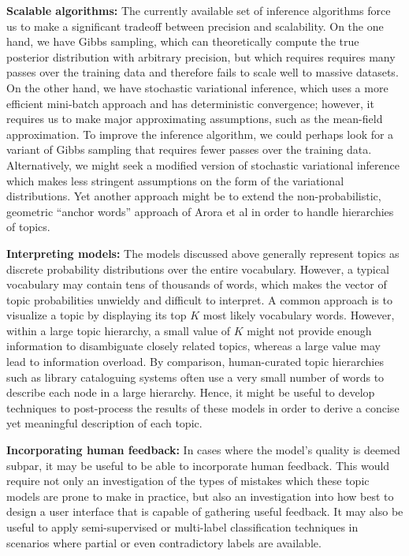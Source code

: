 \documentclass{article}
\begin{document}
\textbf{Scalable algorithms:}
The currently available set of inference algorithms force us to make a significant tradeoff between precision and scalability.
On the one hand, we have Gibbs sampling, which can theoretically compute the true posterior distribution with arbitrary precision, but which requires requires many passes over the training data and therefore fails to scale well to massive datasets.
On the other hand, we have stochastic variational inference, which uses a more efficient mini-batch approach and has deterministic convergence; however, it requires us to make major approximating assumptions, such as the mean-field approximation.
To improve the inference algorithm, we could perhaps look for a variant of Gibbs sampling that requires fewer passes over the training data.
Alternatively, we might seek a modified version of stochastic variational inference which makes less stringent assumptions on the form of the variational distributions.
Yet another approach might be to extend the non-probabilistic, geometric ``anchor words'' approach of Arora et al \cite{arora2013practical} in order to handle hierarchies of topics.

\textbf{Interpreting models:}
The models discussed above generally represent topics as discrete probability distributions over the entire vocabulary.
However, a typical vocabulary may contain tens of thousands of words, which makes the vector of topic probabilities unwieldy and difficult to interpret.
A common approach is to visualize a topic by displaying its top $K$ most likely vocabulary words.
However, within a large topic hierarchy, a small value of $K$ might not provide enough information to disambiguate closely related topics, whereas a large value may lead to information overload.
By comparison, human-curated topic hierarchies such as library cataloguing systems often use a very small number of words to describe each node in a large hierarchy.
Hence, it might be useful to develop techniques to post-process the results of these models in order to derive a concise yet meaningful description of each topic.

\textbf{Incorporating human feedback:}
In cases where the model's quality is deemed subpar, it may be useful to be able to incorporate human feedback.
This would require not only an investigation of the types of mistakes which these topic models are prone to make in practice, but also an investigation into how best to design a user interface that is capable of gathering useful feedback.
It may also be useful to apply semi-supervised or multi-label classification techniques in scenarios where partial or even contradictory labels are available.
\end{document}

